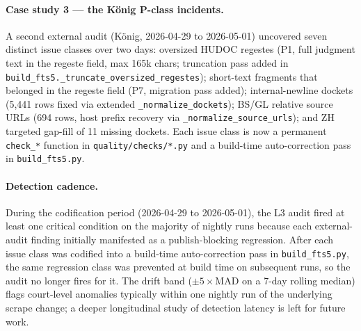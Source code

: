 \paragraph{Case study 3 --- the König P-class incidents.}
A second external audit (König, 2026-04-29 to 2026-05-01) uncovered seven
distinct issue classes over two days: oversized HUDOC regestes (P1, full
judgment text in the regeste field, max 165k chars; truncation pass added
in \texttt{build\_fts5.\_truncate\_oversized\_regestes}); short-text
fragments that belonged in the regeste field (P7, migration pass added);
internal-newline dockets (5{,}441 rows fixed via extended
\texttt{\_normalize\_dockets}); BS/GL relative source URLs (694 rows, host
prefix recovery via \texttt{\_normalize\_source\_urls}); and ZH targeted
gap-fill of 11 missing dockets. Each issue class is now a permanent
\texttt{check\_*} function in \texttt{quality/checks/*.py} and a build-time
auto-correction pass in \texttt{build\_fts5.py}.

\paragraph{Detection cadence.} During the codification period
(2026-04-29 to 2026-05-01), the L3 audit fired at least one critical
condition on the majority of nightly runs because each external-audit
finding initially manifested as a publish-blocking regression. After
each issue class was codified into a build-time auto-correction pass in
\texttt{build\_fts5.py}, the same regression class was prevented at
build time on subsequent runs, so the audit no longer fires for it.
The drift band ($\pm 5{\times}\mathrm{MAD}$ on a 7-day rolling median)
flags court-level anomalies typically within one nightly run of the
underlying scrape change; a deeper longitudinal study of detection
latency is left for future work.
